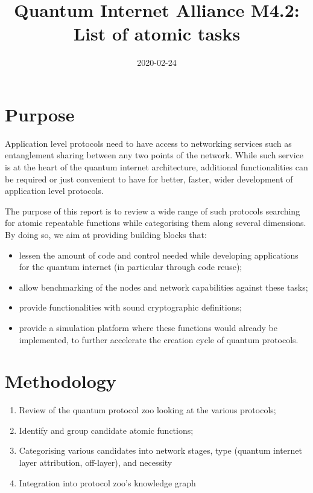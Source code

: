 \documentclass[11pt]{article}
\date{2020-02-24}
\title{Quantum Internet Alliance M4.2: List of atomic tasks}
\begin{document}
\maketitle


\section{Purpose}
\label{sec:org1d5599c}
Application level protocols need to have access to networking services such as entanglement sharing between any two points of the network. While such service is at the heart of the quantum internet architecture, additional functionalities can be required or just convenient to have for better, faster, wider development of application level protocols. 

The purpose of this report is to review a wide range of such protocols searching for atomic repeatable functions while categorising them along several dimensions. By doing so, we aim at providing building blocks that:
\begin{itemize}
\item lessen the amount of code and control needed while developing applications for the quantum internet (in particular through code reuse);
\item allow benchmarking of the nodes and network capabilities against these tasks;
\item provide functionalities with sound cryptographic definitions;
\item provide a simulation platform where these functions would already be implemented, to further accelerate the creation cycle of quantum protocols.
\end{itemize}

\section{Methodology}
\label{sec:org7c39780}
\begin{enumerate}
\item Review of the quantum protocol zoo looking at the various protocols;
\item Identify and group candidate atomic functions;
\item Categorising various candidates into network stages, type (quantum internet layer attribution, off-layer), and necessity
\item Integration into protocol zoo's knowledge graph
\end{enumerate}
\end{document}
